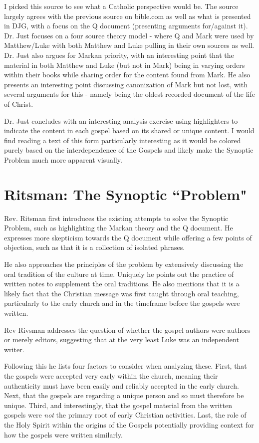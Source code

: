 \documentclass[12pt]{turabian-researchpaper}
\begin{document}
I picked this source to see what a Catholic perspective would be. The source largely agrees with the previous source on bible.com as well as what is presented in DJG, with a focus on the Q document (presenting arguments for/against it). Dr. Just focuses on a four source theory model - where Q and Mark were used by Matthew/Luke with both Matthew and Luke pulling in their own sources as well. Dr. Just also argues for Markan priority, with an interesting point that the material in both Matthew and Luke (but not in Mark) being in varying orders within their books while sharing order for the content found from Mark. He also presents an interesting point discussing canonization of Mark but not lost, with several arguments for this - namely being the oldest recorded document of the life of Christ.

Dr. Just concludes with an interesting analysis exercise using highlighters to indicate the content in each gospel based on its shared or unique content. I would find reading a text of this form particularly interesting as it would be colored purely based on the interdependence of the Gospels and likely make the Synoptic Problem much more apparent visually.

\section{Ritsman: The Synoptic ``Problem"\autocite{Ritsman18}}



Rev. Ritsman first introduces the existing attempts to solve the Synoptic Problem, such as highlighting the Markan theory and the Q document. He expresses more skepticism towards the Q document while offering a few points of objection, such as that it is a collection of isolated phrases. 

He also approaches the principles of the problem by extensively discussing the oral tradition of the culture at time. Uniquely he points out the practice of written notes to supplement the oral traditions. He also mentions that it is a likely fact that the Christian message was first taught through oral teaching, particularly to the early church and in the timeframe before the gospels were written.

Rev Rivsman addresses the question of whether the gospel authors were authors or merely editors, suggesting that at the very least Luke was an independent writer. 

Following this he lists four factors to consider when analyzing these. First, that the gospels were accepted very early within the church, meaning their authenticity must have been easily and reliably accepted in the early church. Next, that the gospels are regarding a unique person and so must therefore be unique. Third, and interestingly, that the gospel material from the written gospels were \textit{not} the primary root of early Christian activities. Last, the role of the Holy Spirit within the origins of the Gospels potentially providing context for how the gospels were written similarly.
\end{document}
